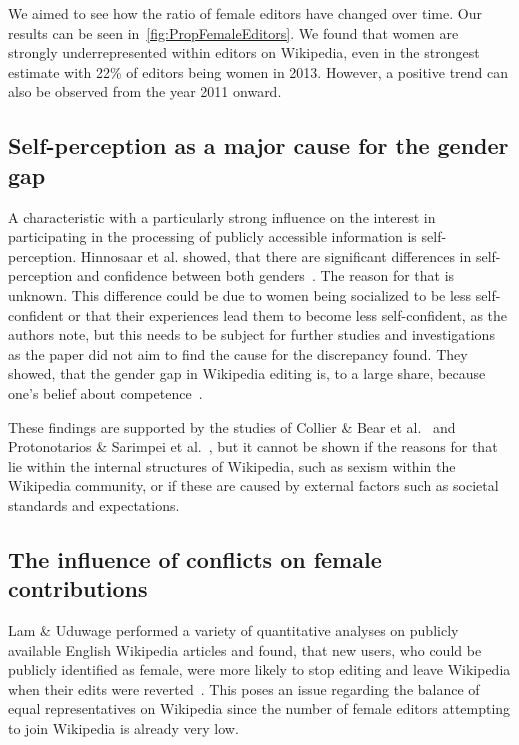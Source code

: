 \documentclass[a4paper, 11pt]{article}
\begin{document}
We aimed to see how the ratio of female editors have changed over time. Our results can be seen in~\autoref{fig:PropFemaleEditors}. We found that women are strongly underrepresented within editors on Wikipedia, even in the strongest estimate with 22\% of editors being women in 2013. However, a positive trend can also be observed from the year 2011 onward.

\subsection{Self-perception as a major cause for the gender gap} \label{sec:gender-gap-wikipedia:self-perception}
A characteristic with a particularly strong influence on the interest in participating in the processing of publicly accessible information is self-perception. Hinnosaar et al. showed, that there are significant differences in self-perception and confidence between both genders~\cite{hinnosaar2019gender}. The reason for that is unknown. This difference could be due to women being socialized to be less self-confident or that their experiences lead them to become less self-confident, as the authors note, but this needs to be subject for further studies and investigations as the paper did not aim to find the cause for the discrepancy found. They showed, that the gender gap in Wikipedia editing is, to a large share, because one’s belief about competence~\cite{hinnosaar2019gender}.

These findings are supported by the studies of Collier \& Bear et al.~\cite{collier2012conflict} and Protonotarios \& Sarimpei et al.~\cite{protonotarios2016similar}, but it cannot be shown if the reasons for that lie within the internal structures of Wikipedia, such as sexism within the Wikipedia community, or if these are caused by external factors such as societal standards and expectations.

\subsection{The influence of conflicts on female contributions} \label{sec:gender-gap-wikipedia:conflicts}
Lam \& Uduwage performed a variety of quantitative analyses on publicly available English Wikipedia articles and found, that new users, who could be publicly identified as female, were more likely to stop editing and leave Wikipedia when their edits were reverted~\cite{lam2011wp}. This poses an issue regarding the balance of equal representatives on Wikipedia since the number of female editors attempting to join Wikipedia is already very low.
\end{document}
